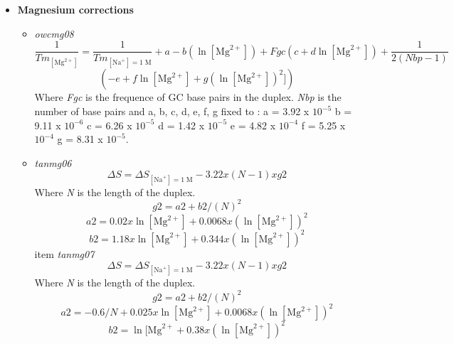 \documentclass{article}
\begin{document}
\begin{itemize}
\item \textbf{Magnesium corrections}
  \begin{itemize}
  \item \textit{owcmg08}
 \begin{displaymath}
 \frac{1}{Tm_{[\mbox{Mg}^{2+}]}} = \frac{1}{Tm_{[\mbox{Na}^+]=1\;\mathrm{M}}} + a
 - b (\ln [\mbox{Mg}^{2+}]) + Fgc (c + d \ln [\mbox{Mg}^{2+}]) + \frac{1}{2 (Nbp-1)} 
 \end{displaymath}
 \begin{displaymath}
 (-e + f \ln [\mbox{Mg}^{2+}] + g (\ln [\mbox{Mg}^{2+}])^{2}])
 \end{displaymath}
 Where \emph{Fgc} is the frequence of GC base pairs in the duplex.
 \emph{Nbp} is the number of base pairs
 and a, b, c, d, e, f, g fixed to :
 a = 3.92 x $10^{-5}$
 b = 9.11 x $10^{-6}$
 c = 6.26 x $10^{-5}$
 d = 1.42 x $10^{-5}$
 e = 4.82 x $10^{-4}$
 f = 5.25 x $10^{-4}$
 g = 8.31 x $10^{-5}$.
 \item \textit{tanmg06}
 \begin{displaymath}
  \Delta{}S=\Delta{}S_{[\mbox{Na}^+]=1\;\mathrm{M}}- 3.22 x (N - 1) x g2  
 \end{displaymath}
 Where \emph{N} is the length of the duplex.
 \begin{displaymath}
  g2=a2 + b2 / (N)^2  
 \end{displaymath}
 \begin{displaymath}
  a2= 0.02 x \ln [\mbox{Mg}^{2+}] + 0.0068 x (\ln [\mbox{Mg}^{2+}])^2  
 \end{displaymath}
 \begin{displaymath}
  b2= 1.18 x \ln [\mbox{Mg}^{2+}] + 0.344 x (\ln [\mbox{Mg}^{2+}])^2
 \end{displaymath}
 item \textit{tanmg07}
 \begin{displaymath}
  \Delta{}S=\Delta{}S_{[\mbox{Na}^+]=1\;\mathrm{M}}- 3.22 x (N - 1) x g2  
 \end{displaymath}
 Where \emph{N} is the length of the duplex.
 \begin{displaymath}
  g2=a2 + b2 / (N)^2  
 \end{displaymath}
 \begin{displaymath}
  a2= -0.6 / N + 0.025 x \ln [\mbox{Mg}^{2+}] + 0.0068 x (\ln [\mbox{Mg}^{2+}])^2  
 \end{displaymath}
 \begin{displaymath}
  b2= \ln [\mbox{Mg}^{2+} + 0.38 x (\ln [\mbox{Mg}^{2+}])^2  
 \end{displaymath}
 \end{itemize}
 

\end{itemize}
\end{document}
